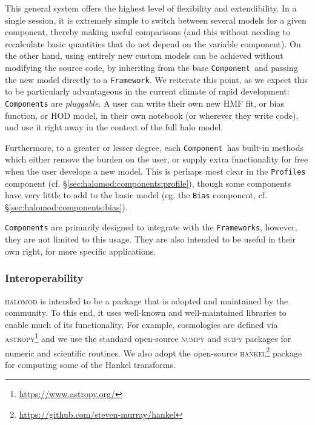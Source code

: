 \documentclass[5p,aas_macros]{elsarticle}
\newcommand{\framework}{\texttt{Framework}\xspace} %
\newcommand{\component}{\texttt{Component}\xspace} %
\begin{document}
This general system offers the highest level of flexibility and extendibility. In a single session, it is extremely simple to switch between several models for a given component, thereby making useful comparisons (and this without needing to recalculate basic quantities that do not depend on the variable component). On the other hand, using entirely new custom models can be achieved without modifying the source code, by inheriting from the base \component\ and passing the new model directly to a \framework. We reiterate this point, as we expect this to be particularly advantageous in the current climate of rapid development: \texttt{Components} are \textit{pluggable}. A user can write their own new HMF fit, or bias function, or HOD model, in their own notebook (or wherever they write code), and use it right away in the context of the full halo model. 

Furthermore, to a greater or lesser degree, each \component\ has built-in methods which either remove the burden on the user, or supply extra functionality for free when the user develops a new model. This is perhaps most clear in the \verb|Profiles| component (cf. \S\ref{sec:halomod:components:profile}), though some components have very little to add to the basic model (eg. the \verb|Bias| component, cf. \S\ref{sec:halomod:components:bias}). 

\texttt{Components} are primarily designed to integrate with the \texttt{Frameworks}, however, they are not limited to this usage. They are also intended to be useful in their own right, for more specific applications. 


\subsubsection{Interoperability}
\textsc{halomod} is intended to be a package that is adopted and maintained by the community. To this end, it uses well-known and well-maintained libraries to enable much of its functionality. 
For example, cosmologies are defined via \textsc{astropy}\footnote{\url{https://www.astropy.org/}} and we use the standard open-source \textsc{numpy} and \textsc{scipy} packages for numeric and scientific routines. 
We also adopt the open-source \textsc{hankel}\footnote{\url{https://github.com/steven-murray/hankel}} \citep{Murray2019} package for computing some of the Hankel transforms.
\end{document}
